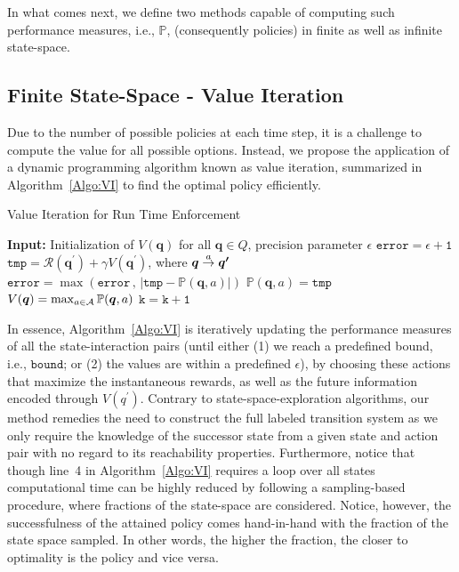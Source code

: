 In what comes next, we define two methods capable of computing such performance measures, i.e., $\mathbb{P}$,  (consequently policies) in finite as well as infinite state-space. 

\subsection{Finite State-Space - Value Iteration}
Due to the number of possible policies at each time step, it is a challenge to compute the value for all possible options. Instead, we propose the application of a dynamic programming algorithm known as value iteration, summarized in Algorithm~\ref{Algo:VI} to find the optimal policy efficiently. 
\begin{algorithm}[h!]
\caption{Value Iteration for Run Time Enforcement}
\label{Algo:VI}
\begin{algorithmic}[1]
\STATE \textbf{Input:} Initialization of $V( \bm{q})$ for all $ \bm{q}\in Q$, precision parameter $\epsilon$
\STATE $\mathtt{error = \epsilon + 1} $
			\STATE $\mathtt{tmp} = \mathcal{R}( \bm{q^{\prime}}) + \gamma V( \bm{q^{\prime}})$, where $ \bm{q} \goesto[a] \bm{q^{\prime}}$
		\STATE $\mathtt{error} =\max(\mathtt{error}\, , \, |\mathtt{tmp} - \mathbb{P}( \bm{q}, a)|)$
			\STATE $\mathbb{P}( \bm{q}, a) = \mathtt{tmp}$
		\ENDFOR
	\STATE $V( \bm{q}) =  \max_{a \in {\cal A}} \mathbb{P}( \bm{q}, a)$
	\ENDFOR
	\STATE $\mathtt{k = k + 1}$
\ENDWHILE
\end{algorithmic}
\end{algorithm}

In essence, Algorithm~\ref{Algo:VI} is iteratively updating the performance measures of all the state-interaction pairs (until either (1) we reach a predefined bound, i.e., $\mathtt{bound}$; or (2) the values are within a predefined $\epsilon$),  by choosing these actions that maximize the instantaneous rewards, as well as the future information encoded through $V(q^{\prime})$. 
Contrary to state-space-exploration algorithms, our method remedies the need to construct the full labeled transition system as we only require the knowledge of the successor state from a given state and action pair with no regard to its reachability properties. Furthermore, notice that though line~4 in Algorithm~\ref{Algo:VI} requires a loop over all states computational time can be highly reduced by following a sampling-based procedure, where fractions of the state-space are considered. Notice, however, the successfulness of the attained policy comes hand-in-hand with the fraction of the state space sampled. In other words, the higher the fraction, the closer to optimality is the policy and vice versa. 


